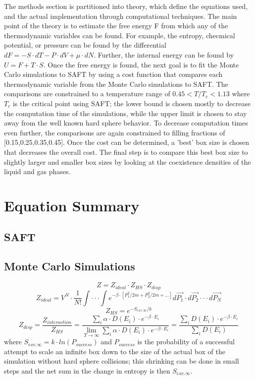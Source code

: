The methods section is partitioned into theory, which define the equations used, and the actual implementation through computational techniques. The main point of the theory is to estimate the free energy F from which any of the thermodynamic variables can be found. For example, the entropy, checmical potential, or pressure can be found by the differential $dF=-S\cdot dT -P\cdot dV+\mu\cdot dN$. Further, the internal energy can be found by $U=F+T\cdot S$. Once the free energy is found, the next goal is to fit the Monte Carlo simulations to SAFT by using a cost function that compares each thermodynamic variable from the Monte Carlo simulations to SAFT. The comparisons are constrained to a temperature range of $0.45<T/T_c<1.13$ where $T_c$ is the critical point using SAFT; the lower bound is chosen mostly to decrease the computation time of the simulations, while the upper limit is chosen to stay away from the well known hard sphere behavior. To decrease computation times even further, the comparisons are again constrained to filling fractions of [0.15,0.25,0.35,0.45]. Once the cost can be determined, a 'best' box size is chosen that decreases the overall cost. The final step is to compare this best box size to slightly larger and smaller box sizes by looking at the coexistence densities of the liquid and gas phases.

\section{Equation Summary}
\subsection{SAFT}
\subsection{Monte Carlo Simulations}
$$Z=Z_{ideal}\cdot Z_{HS}\cdot Z_{disp}$$
$$Z_{ideal}=V^N\cdot\frac{1}{N!}\int\cdot\cdot\cdot\int e^{-\beta\cdot [P_{1}^2/{2m}+P_{2}^2/{2m}+...]}d\vec{P_1}\cdot d\vec{P_2}\cdot\cdot\cdot d\vec{P_N}$$
$$Z_{HS}=e^{-S_{exc.\infty}/k}$$
$$Z_{disp}=\frac{Z_{interaction}}{Z_{HS}}=\frac{\sum_i \alpha\cdot D(E_i)\cdot e^{-\beta\cdot E_i}}{\lim_{T\to\infty}\sum_i \alpha\cdot D(E_i)\cdot e^{-\beta\cdot E_i}}=\frac{\sum_i D(E_i)\cdot e^{-\beta\cdot E_i}}{\sum_i D(E_i)}$$
where $S_{exc.\infty}=k\cdot ln(P_{success})$ and $P_{success}$ is the probability of a successful attempt to scale an infinite box down to the size of the actual box of the simulation without hard sphere collisions; this shrinking can be done in small steps and the net sum in the change in entropy is then $S_{exc.\infty}$.

